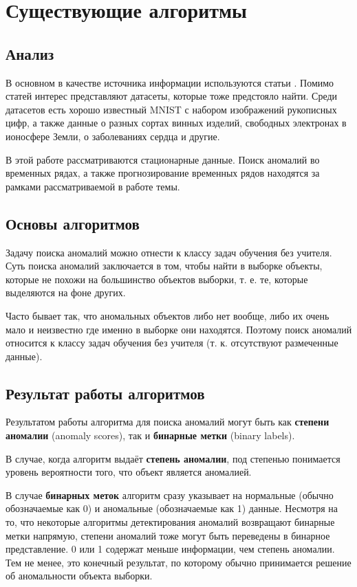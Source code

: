 \chapter{Существующие алгоритмы} \label{ch:ch2}

\section{Анализ} \label{sec:ch2/sec1}

В основном в качестве источника информации используются статьи \cite{dai, hodge, vakili, varun, billor, wilkinson}. Помимо статей интерес представляют датасеты, которые тоже предстояло найти. Среди датасетов есть хорошо известный MNIST с набором изображений рукописных цифр, а также данные о разных сортах винных изделий, свободных электронах в ионосфере Земли, о заболеваниях сердца и другие.

В этой работе рассматриваются стационарные данные. Поиск аномалий во временных рядах, а также прогнозирование временных рядов находятся за рамками рассматриваемой в работе темы.

\section{Основы алгоритмов} \label{sec:ch2/sec2}

Задачу поиска аномалий можно отнести к классу задач обучения без учителя. Суть поиска аномалий заключается в том, чтобы найти в выборке объекты, которые не похожи на большинство объектов выборки, т. е. те, которые выделяются на фоне других.

Часто бывает так, что аномальных объектов либо нет вообще, либо их очень мало и неизвестно где именно в выборке они находятся. Поэтому поиск аномалий относится к классу задач обучения без учителя (т. к. отсутствуют размеченные данные).

\section{Результат работы алгоритмов} \label{sec:ch1/sec2}

Результатом работы алгоритма для поиска аномалий могут быть как \textbf{степени аномалии} (anomaly scores), так и \textbf{бинарные метки} (binary labels).

В случае, когда алгоритм выдаёт \textbf{степень аномалии}, под степенью понимается уровень вероятности того, что объект является аномалией.

В случае \textbf{бинарных меток} алгоритм сразу указывает на нормальные (обычно обозначаемые как 0) и аномальные (обозначаемые как 1) данные. Несмотря на то, что некоторые алгоритмы детектирования аномалий возвращают бинарные метки напрямую, степени аномалий тоже могут быть переведены в бинарное представление. 0 или 1 содержат меньше информации, чем степень аномалии. Тем не менее, это конечный результат, по которому обычно принимается решение об аномальности объекта выборки.


